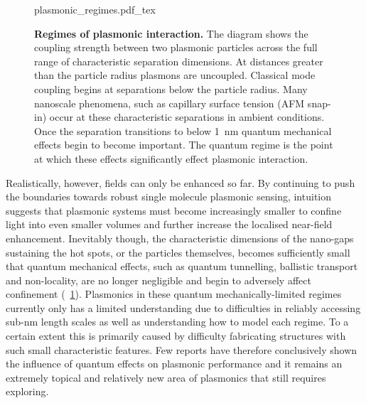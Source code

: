 \documentclass[12pt, a4paper, twoside]{book}
\begin{document}
\begin{figure}[bt]
\centering
\fontsize{10pt}{1em}\selectfont
{plasmonic_regimes.pdf_tex}
\caption[Regimes of plasmonic interaction.]{\textbf{Regimes of plasmonic interaction.} The diagram shows the coupling strength between two plasmonic particles across the full range of characteristic separation dimensions. At distances greater than the particle radius plasmons are uncoupled. Classical mode coupling begins at separations below the particle radius. Many nanoscale phenomena, such as capillary surface tension (AFM snap-in) occur at these characteristic separations in ambient conditions. Once the separation transitions to below \SI{1}{nm} quantum mechanical effects begin to become important. The quantum regime is the point at which these effects significantly effect plasmonic interaction.}
\label{fig:plasmonic_regimes}
\vspace{-10pt}
\end{figure}

Realistically, however, fields can only be enhanced so far. By continuing to push the boundaries towards robust single molecule plasmonic sensing, intuition suggests that plasmonic systems must become increasingly smaller to confine light into even smaller volumes and further increase the localised near-field enhancement. Inevitably though, the characteristic dimensions of the nano-gaps sustaining the hot spots, or the particles themselves, becomes sufficiently small that quantum mechanical effects, such as quantum tunnelling, ballistic transport and non-locality, are no longer negligible and begin to adversely affect confinement (\figurename~\ref{fig:plasmonic_regimes}). Plasmonics in these quantum mechanically-limited regimes currently only has a limited understanding due to difficulties in reliably accessing sub-nm length scales as well as understanding how to model each regime. To a certain extent this is primarily caused by difficulty fabricating structures with such small characteristic features. Few reports have therefore conclusively shown the influence of quantum effects on plasmonic performance and it remains an extremely topical and relatively new area of plasmonics that still requires exploring.
\end{document}

